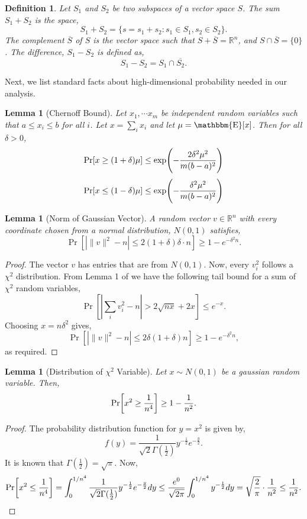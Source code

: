 \documentclass[11pt]{article}
\newtheorem{lemma}[theorem]{Lemma}
\newtheorem{definition}[theorem]{Definition}
\DeclareMathOperator*{\av}{\mathbbm{E}}
\let\originalleft\left
\let\originalright\right
\renewcommand{\left}{\mathopen{}\mathclose\bgroup\originalleft}
\renewcommand{\right}{\aftergroup\egroup\originalright}
\newcommand\ff{\boldsymbol{\mathit{f}}}
\newcommand\vv{\boldsymbol{\mathit{v}}}
\begin{document}
\begin{definition}\label{def:subspace}Let $S_1$ and $S_2$ be two subspaces of a vector space $S$. The sum $S_1+S_2$ is the space,
\[
S_1+S_2 = \{s=s_1+s_2: s_1\in S_1, s_2 \in S_2\}.
\]
The complement $\overline{S}$ of $S$ is the vector space such that $S+\overline{S} = \mathbb{R}^n$, and $S\cap \overline{S} = \{0\}$. The difference, $S_1-S_2$ is defined as,
\[
S_1-S_2 = S_1\cap \overline{S_2}.
\]
\end{definition}

Next, we list standard facts about high-dimensional probability needed in our analysis.

\begin{lemma}[Chernoff Bound]\label{lem:Bernstein} Let $x_1,\cdots x_m$ be independent random variables such that $a\leq x_i\leq b$ for all $i$. Let $x = \sum_i x_i$ and let $\mu = \av[x]$. Then for all $\delta>0$,
\[
\Pr[x\geq(1+ \delta) \mu] \leq \exp \left(- \frac{2\delta^2\mu^2 }{m(b-a)^2} \right)
\]
\[
\Pr[x \leq (1-\delta) \mu] \leq \exp \left(- \frac{\delta^2\mu^2 }{m(b-a)^2} \right)
\]
\end{lemma}

\begin{lemma}[Norm of Gaussian Vector]\label{lem:NormG}
A random vector $\vv \in \mathbb{R}^n$ with every coordinate chosen from a normal distribution, $N(0,1)$ satisfies,
\[
\Pr[|\|\vv\|^2- n| \leq 2(1+\delta)\delta\cdot n ] \geq 1- e^{-\delta^2  n}.
\]
\end{lemma}
\begin{proof}
The vector $\vv$ has entries that are from $N(0,1)$. Now, every $\vv_i^2$ follows a $\chi^2$ distribution. From Lemma 1 of \cite{laurent2000adaptive} we have the following tail bound for a sum of $\chi^2$ random variables,
\[
\Pr[|\sum_i \vv^2_i - n| > 2\sqrt{nx} + 2x]\leq e^{-x}.
\]
Choosing $x = n\delta^2$ gives,
\[
\Pr[|\|\vv\|^2 - n| \leq 2\delta(1+\delta) n]\geq 1-e^{-\delta^2 n},
\] 
as required.
\end{proof}

\begin{lemma}[Distribution of $\chi^2$ Variable]\label{lem:chi}
Let $x\sim N(0,1)$ be a gaussian random variable. Then,
\[
\Pr\left[x^2\geq \frac{1}{n^4}\right] \geq 1- \frac{1}{n^{2}}.
\]
\end{lemma}
\begin{proof}
The probability distribution function for $y = x^2$ is given by,
\[
\ff(y) = \frac{1}{\sqrt{2}\Gamma(\frac{1}{2})}y^{-\frac{1}{2}}e^{-\frac{y}{2}}.
\]
It is known that $\Gamma(\frac{1}{2}) = \sqrt{\pi}$. Now, 
\begin{align*}
\Pr\left[x^2\leq \frac{1}{n^4}\right] =  \int_{0}^{1/n^4}\frac{1}{\sqrt{2}\Gamma(\frac{1}{2})}y^{-\frac{1}{2}}e^{-\frac{y}{2}}dy
\leq  \frac{e^0}{\sqrt{2\pi}} \int_{0}^{1/n^4} y^{-\frac{1}{2}}dy
=  \sqrt{\frac{2}{\pi}} \cdot \frac{1}{n^{2}}
\leq  \frac{1}{n^{2}}.
\end{align*}
\end{proof}
\end{document}
